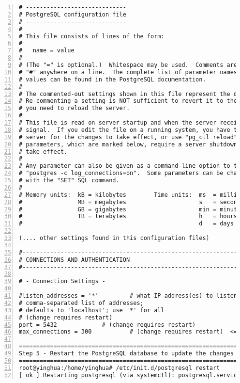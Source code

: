 \begin{lstlisting}[breaklines, frame=single, numbers=left, caption={Increase Max Concurrent Connection Limit}, label=commandline-02]
# -----------------------------
# PostgreSQL configuration file
# -----------------------------
#
# This file consists of lines of the form:
#
#   name = value
#
# (The "=" is optional.)  Whitespace may be used.  Comments are introduced with
# "#" anywhere on a line.  The complete list of parameter names and allowed
# values can be found in the PostgreSQL documentation.
#
# The commented-out settings shown in this file represent the default values.
# Re-commenting a setting is NOT sufficient to revert it to the default value;
# you need to reload the server.
#
# This file is read on server startup and when the server receives a SIGHUP
# signal.  If you edit the file on a running system, you have to SIGHUP the
# server for the changes to take effect, or use "pg_ctl reload".  Some
# parameters, which are marked below, require a server shutdown and restart to
# take effect.
#
# Any parameter can also be given as a command-line option to the server, e.g.,
# "postgres -c log_connections=on".  Some parameters can be changed at run time
# with the "SET" SQL command.
#
# Memory units:  kB = kilobytes        Time units:  ms  = milliseconds
#                MB = megabytes                     s   = seconds
#                GB = gigabytes                     min = minutes
#                TB = terabytes                     h   = hours
#                                                   d   = days

(.... other settings found in this configuration files) 

#------------------------------------------------------------------------------
# CONNECTIONS AND AUTHENTICATION
#------------------------------------------------------------------------------

# - Connection Settings -

#listen_addresses = '*'			# what IP address(es) to listen on;
# comma-separated list of addresses;
# defaults to 'localhost'; use '*' for all
# (change requires restart)
port = 5432				# (change requires restart)
max_connections = 300			# (change requires restart)  <========== Modify from 100 to 300 

===================================================================================
Step 5 - Restart the PostgreSQL database to update the changes 
==================================================================================
root@yinghua:/home/yinghua# /etc/init.d/postgresql restart
[ ok ] Restarting postgresql (via systemctl): postgresql.service.

\end{lstlisting}

